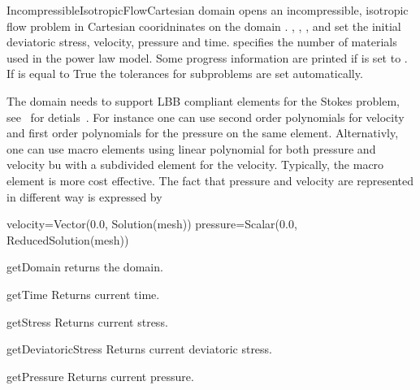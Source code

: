 \begin{classdesc}{IncompressibleIsotropicFlowCartesian}{
domain
}
opens an incompressible, isotropic flow problem in Cartesian cooridninates
on the domain .
,
,
, and
 set the initial deviatoric stress, velocity, pressure and time.
 specifies the number of materials used in the power law
model. Some progress information are printed if  is set to
\True. If  is equal to True the tolerances for subproblems are set automatically.

The domain
needs to support LBB compliant elements for the Stokes problem, see~\cite{LBB} for detials~.
For instance one can use second order polynomials for velocity and 
first order polynomials for the pressure on the same element. Alternativly, one can use 
macro elements using linear polynomial for both pressure and velocity bu with a subdivided
element for the velocity. Typically, the macro element is more cost effective. The fact that pressure and velocity are represented in different way is expressed by
\begin{python}
velocity=Vector(0.0, Solution(mesh))
pressure=Scalar(0.0, ReducedSolution(mesh))
\end{python}
\end{classdesc}

\begin{methoddesc}[IncompressibleIsotropicFlowCartesian]{getDomain}{}
returns the domain.
\end{methoddesc}

\begin{methoddesc}[IncompressibleIsotropicFlowCartesian]{getTime}{}
Returns current time.
\end{methoddesc}

\begin{methoddesc}[IncompressibleIsotropicFlowCartesian]{getStress}{}
Returns current stress.
\end{methoddesc}

\begin{methoddesc}[IncompressibleIsotropicFlowCartesian]{getDeviatoricStress}{}
Returns current deviatoric stress.
\end{methoddesc}

\begin{methoddesc}[IncompressibleIsotropicFlowCartesian]{getPressure}{}
Returns current pressure.
\end{methoddesc}

